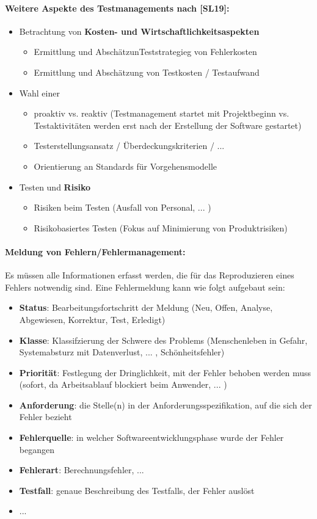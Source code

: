 \paragraph{Weitere Aspekte des Testmanagements nach [SL19]:}
\begin{itemize}
	\item Betrachtung von \textbf{Kosten- und Wirtschaftlichkeitsaspekten}
	\begin{itemize}
		\item Ermittlung und AbschätzunTeststrategieg von Fehlerkosten
		\item Ermittlung und Abschätzung von Testkosten / Testaufwand
	\end{itemize}
	\item Wahl einer \textbf{}
	\begin{itemize}
		\item proaktiv vs. reaktiv (Testmanagement startet mit Projektbeginn vs. Testaktivitäten werden erst nach der Erstellung der Software gestartet)
		\item Testerstellungsansatz / Überdeckungskriterien / ...
		\item Orientierung an Standards für Vorgehensmodelle
	\end{itemize}
	\item Testen und \textbf{Risiko}
	\begin{itemize}
		\item Risiken beim Testen (Ausfall von Personal, ... )
		\item Risikobasiertes Testen (Fokus auf Minimierung von Produktrisiken)
	\end{itemize}
\end{itemize}

\paragraph{Meldung von Fehlern/Fehlermanagement:}
Es müssen alle Informationen erfasst werden, die für das Reproduzieren eines Fehlers notwendig sind. Eine Fehlermeldung kann wie folgt aufgebaut sein:
\begin{itemize}
	\item \textbf{Status}: Bearbeitungsfortschritt der Meldung (Neu, Offen, Analyse, Abgewiesen, Korrektur, Test, Erledigt)
	\item \textbf{Klasse}: Klassifzierung der Schwere des Problems (Menschenleben in Gefahr, Systemabsturz mit Datenverlust, ... , Schönheitsfehler)
	\item \textbf{Priorität}: Festlegung der Dringlichkeit, mit der Fehler behoben werden muss (sofort, da Arbeitsablauf blockiert beim Anwender, ... )
	\item \textbf{Anforderung}: die Stelle(n) in der Anforderungsspezifikation, auf die sich der Fehler bezieht
	\item \textbf{Fehlerquelle}: in welcher Softwareentwicklungsphase wurde der Fehler begangen
	\item \textbf{Fehlerart}: Berechnungsfehler, ...
	\item \textbf{Testfall}: genaue Beschreibung des Testfalls, der Fehler auslöst
	\item ...
\end{itemize}

